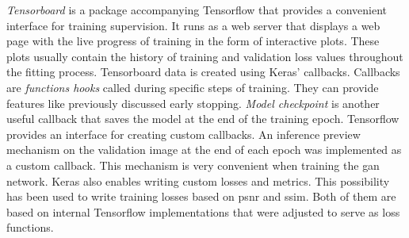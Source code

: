 \textit{Tensorboard} is a package accompanying Tensorflow that provides a convenient interface for training supervision.
It runs as a web server that displays a web page with the live progress of training in the form of interactive plots.
These plots usually contain the history of training and validation loss values throughout the fitting process.
Tensorboard data is created using Keras' callbacks.
Callbacks are \textit{functions hooks} called during specific steps of training.
They can provide features like previously discussed early stopping.
\textit{Model checkpoint} is another useful callback that saves the model at the end of the training epoch.
Tensorflow provides an interface for creating custom callbacks.
An inference preview mechanism on the validation image at the end of each epoch was implemented as a custom callback.
This mechanism is very convenient when training the \gls{gan} network.
Keras also enables writing custom losses and metrics.
This possibility has been used to write training losses based on \gls{psnr} and \gls{ssim}.
Both of them are based on internal Tensorflow implementations that were adjusted to serve as loss functions.